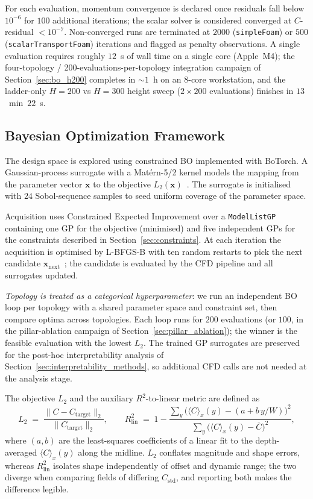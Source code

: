 \documentclass[12pt]{article}
\begin{document}
For each evaluation, momentum convergence is declared once residuals fall below $10^{-6}$ for $100$ additional iterations; the scalar solver is considered converged at $C$-residual $< 10^{-7}$. Non-converged runs are terminated at $2000$ (\texttt{simpleFoam}) or $500$ (\texttt{scalarTransportFoam}) iterations and flagged as penalty observations. A single evaluation requires roughly $12$~s of wall time on a single core (Apple~M4); the four-topology / 200-evaluations-per-topology integration campaign of Section~\ref{sec:bo_h200} completes in $\sim 1$~h on an 8-core workstation, and the ladder-only $H = 200$ vs $H = 300$ height sweep ($2 \times 200$ evaluations) finishes in $13$~min~$22$~s.

\subsection{Bayesian Optimization Framework}
The design space is explored using constrained BO implemented with BoTorch. A Gaussian-process surrogate with a Mat\'ern-5/2 kernel models the mapping from the parameter vector $\mathbf{x}$ to the objective $L_2(\mathbf{x})$~\cite{balandat2019botorch,rasmussen2008gp}. The surrogate is initialised with $24$ Sobol-sequence samples to seed uniform coverage of the parameter space.

Acquisition uses Constrained Expected Improvement over a \texttt{ModelListGP} containing one GP for the objective (minimised) and five independent GPs for the constraints described in Section~\ref{sec:constraints}. At each iteration the acquisition is optimised by L-BFGS-B with ten random restarts to pick the next candidate $\mathbf{x}_{\text{next}}$~\cite{gardner2014boic}; the candidate is evaluated by the CFD pipeline and all surrogates updated.

\emph{Topology is treated as a categorical hyperparameter}: we run an independent BO loop per topology with a shared parameter space and constraint set, then compare optima across topologies. Each loop runs for $200$ evaluations (or $100$, in the pillar-ablation campaign of Section~\ref{sec:pillar_ablation}); the winner is the feasible evaluation with the lowest $L_2$. The trained GP surrogates are preserved for the post-hoc interpretability analysis of Section~\ref{sec:interpretability_methods}, so additional CFD calls are not needed at the analysis stage.

The objective $L_2$ and the auxiliary $R^2$-to-linear metric are defined as
\begin{equation}
L_2 \;=\; \frac{\| C - C_{\text{target}} \|_2}{\| C_{\text{target}} \|_2},
\qquad
R^2_{\text{lin}} \;=\; 1 - \frac{\sum_y \big( \langle C \rangle_x(y) - (a + b\, y/W) \big)^2}{\sum_y \big( \langle C \rangle_x(y) - \overline{C} \big)^2},
\label{eq:l2_r2}
\end{equation}
where $(a, b)$ are the least-squares coefficients of a linear fit to the depth-averaged $\langle C \rangle_x(y)$ along the midline. $L_2$ conflates magnitude and shape errors, whereas $R^2_{\text{lin}}$ isolates shape independently of offset and dynamic range; the two diverge when comparing fields of differing $C_{\text{std}}$, and reporting both makes the difference legible.
\end{document}
